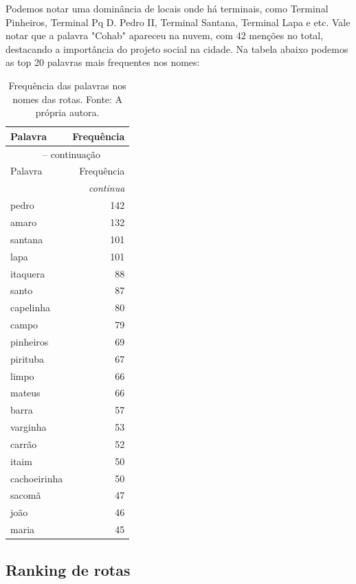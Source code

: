  Podemos notar uma dominância de locais onde há terminais, como Terminal Pinheiros, Terminal Pq D. Pedro II, Terminal Santana, Terminal Lapa e etc. Vale notar que a palavra "Cohab" apareceu na nuvem, com 42 menções no total, destacando a importância do projeto social na cidade. Na tabela abaixo podemos as top 20 palavras mais frequentes nos nomes:


\begin{longtable}{lr}
\caption{Frequência das palavras nos nomes das rotas. Fonte: A própria autora.}
\label{tab:distancias_rotas} \\

\toprule
Palavra & Frequência \\
\midrule
\endfirsthead

\multicolumn{2}{c}{\tablename\ \thetable{} -- continuação} \\
\toprule
Palavra & Frequência \\
\midrule
\endhead

\midrule
\multicolumn{2}{r}{\textit{continua}} \\
\endfoot

\bottomrule
\endlastfoot

pedro & 142 \\
amaro & 132 \\
santana & 101 \\
lapa & 101 \\
itaquera & 88 \\
santo & 87 \\
capelinha & 80 \\
campo & 79 \\
pinheiros & 69 \\
pirituba & 67 \\
limpo & 66 \\
mateus & 66 \\
barra & 57 \\
varginha & 53 \\
carrão & 52 \\
itaim & 50 \\
cachoeirinha & 50 \\
sacomã & 47 \\
joão & 46 \\
maria & 45 \\

\end{longtable}

\subsection{Ranking de rotas}

